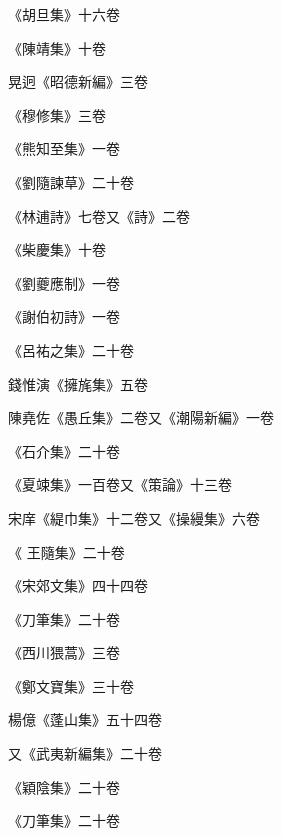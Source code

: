 \begin{pinyinscope}
 《胡旦集》十六卷



 《陳靖集》十卷



 晃迥《昭德新編》三卷



 《穆修集》三卷



 《熊知至集》一卷



 《劉隨諫草》二十卷



 《林逋詩》七卷又《詩》二卷



 《柴慶集》十卷



 《劉夔應制》一卷



 《謝伯初詩》一卷



 《呂祐之集》二十卷



 錢惟演《擁旄集》五卷



 陳堯佐《愚丘集》二卷又《潮陽新編》一卷



 《石介集》二十卷



 《夏竦集》一百卷又《策論》十三卷



 宋庠《緹巾集》十二卷又《操縵集》六卷



 《
 王隨集》二十卷



 《宋郊文集》四十四卷



 《刀筆集》二十卷



 《西川猥蒿》三卷



 《鄭文寶集》三十卷



 楊億《蓬山集》五十四卷



 又《武夷新編集》二十卷



 《穎陰集》二十卷



 《刀筆集》二十卷




\end{pinyinscope}
